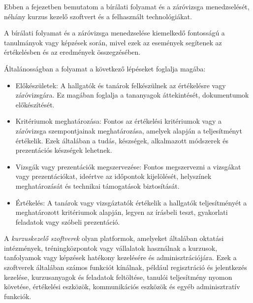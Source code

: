 
Ebben a fejezetben bemutatom a bírálati folyamat és a záróvizsga menedzselését, néhány kurzus kezelő szoftvert és a felhasznált technológiákat.


A bírálati folyamat és a záróvizsga menedzselése kiemelkedő fontosságú a tanulmányok vagy képzések során, mivel ezek az események segítenek az értékelésben és az eredmények összegzésében.

Általánosságban a folyamat a következő lépéseket foglalja magába:

\begin{itemize}

\item Előkészületek: A hallgatók és tanárok felkészülnek az értékelésre vagy záróvizsgára. Ez magában foglalja a tananyagok áttekintését, dokumentumok előkészítését.

\item Kritériumok meghatározása: Fontos az értékelési kritériumok vagy a záróvizsga szempontjainak meghatározása, amelyek alapján a teljesítményt értékelik. Ezek általában a tudás, készségek, alkalmazott módszerek és prezentációs készségek lehetnek.

\item Vizsgák vagy prezentációk megszervezése: Fontos megszervezni a vizsgákat vagy prezentációkat, ideértve az időpontok kijelölését, helyszínek meghatározását és technikai támogatások biztosítását.

\item Értékelés: A tanárok vagy vizsgáztatók értékelik a hallgatók teljesítményét a meghatározott kritériumok alapján, legyen az írásbeli teszt, gyakorlati feladatok vagy szóbeli prezentáció.

\end{itemize}



A \textit{kurzuskezelő szoftverek} \cite{course} olyan platformok, amelyeket általában oktatási intézmények, tréningközpontok vagy vállalatok használnak a kurzusok, tanfolyamok vagy képzések hatékony kezelésére és adminisztrációjára. Ezek a szoftverek általában számos funkciót kínálnak, például regisztráció és jelentkezés kezelése, kurzusanyagok és feladatok feltöltése, tanulói teljesítmény nyomon követése, értékelési eszközök, kommunikációs eszközök és egyéb adminisztratív funkciók.

